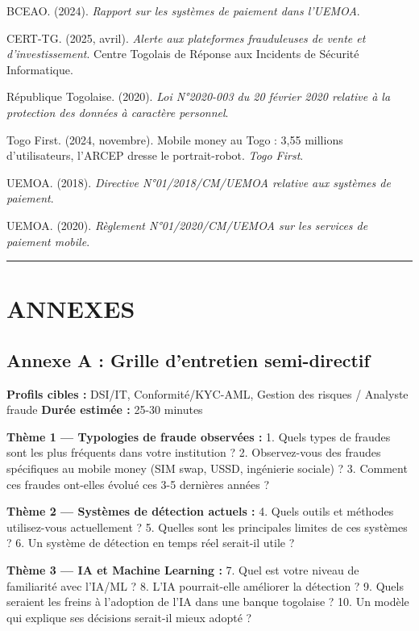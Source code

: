 \documentclass[
  12pt,
]{article}
\begin{document}
BCEAO. (2024). \emph{Rapport sur les systèmes de paiement dans l’UEMOA}.

CERT-TG. (2025, avril). \emph{Alerte aux plateformes frauduleuses de
vente et d’investissement}. Centre Togolais de Réponse aux Incidents de
Sécurité Informatique.

République Togolaise. (2020). \emph{Loi N°2020-003 du 20 février 2020
relative à la protection des données à caractère personnel}.

Togo First. (2024, novembre). Mobile money au Togo : 3,55 millions
d’utilisateurs, l’ARCEP dresse le portrait-robot. \emph{Togo First}.

UEMOA. (2018). \emph{Directive N°01/2018/CM/UEMOA relative aux systèmes
de paiement}.

UEMOA. (2020). \emph{Règlement N°01/2020/CM/UEMOA sur les services de
paiement mobile}.

\begin{center}\rule{0.5\linewidth}{0.5pt}\end{center}

\section{ANNEXES}\label{annexes}

\subsection{Annexe A : Grille d’entretien
semi-directif}\label{annexe-a-grille-dentretien-semi-directif}

\textbf{Profils cibles :} DSI/IT, Conformité/KYC-AML, Gestion des
risques / Analyste fraude \textbf{Durée estimée :} 25-30 minutes

\textbf{Thème 1 — Typologies de fraude observées :} 1. Quels types de
fraudes sont les plus fréquents dans votre institution ? 2.
Observez-vous des fraudes spécifiques au mobile money (SIM swap, USSD,
ingénierie sociale) ? 3. Comment ces fraudes ont-elles évolué ces 3-5
dernières années ?

\textbf{Thème 2 — Systèmes de détection actuels :} 4. Quels outils et
méthodes utilisez-vous actuellement ? 5. Quelles sont les principales
limites de ces systèmes ? 6. Un système de détection en temps réel
serait-il utile ?

\textbf{Thème 3 — IA et Machine Learning :} 7. Quel est votre niveau de
familiarité avec l’IA/ML ? 8. L’IA pourrait-elle améliorer la détection
? 9. Quels seraient les freins à l’adoption de l’IA dans une banque
togolaise ? 10. Un modèle qui explique ses décisions serait-il mieux
adopté ?
\end{document}
